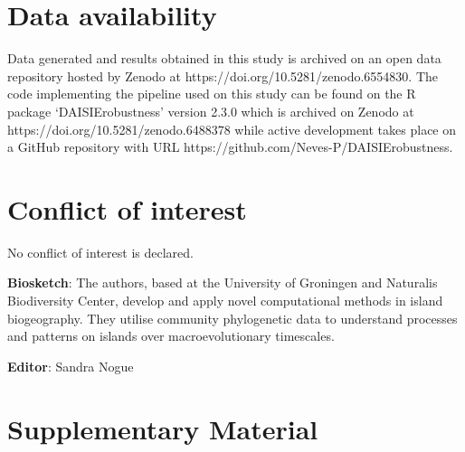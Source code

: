 \documentclass{article}
\begin{document}
\section*{Data availability}

Data generated and results obtained in this study is archived on an open data repository hosted by Zenodo at https://doi.org/10.5281/zenodo.6554830. The code implementing the pipeline used on this study can be found on the R package `DAISIErobustness' version 2.3.0 which is archived on Zenodo at https://doi.org/10.5281/zenodo.6488378 while active development takes place on a GitHub repository with URL https://github.com/Neves-P/DAISIErobustness.

\section*{Conflict of interest}

No conflict of interest is declared.





\noindent \textbf{Biosketch}: The authors, based at the University of Groningen and Naturalis Biodiversity Center, develop and apply novel computational methods in island biogeography. They utilise community phylogenetic data to understand processes and patterns on islands over macroevolutionary timescales.

\noindent \textbf{Editor}: Sandra Nogue

\clearpage

\newcommand{\beginsupplement}{%
        \setcounter{table}{0}
        \renewcommand{\thetable}{S\arabic{table}}%
        \setcounter{figure}{0}
        \renewcommand{\thefigure}{S\arabic{figure}}%
     }
     
\beginsupplement
\section*{Supplementary Material}

\end{document}
